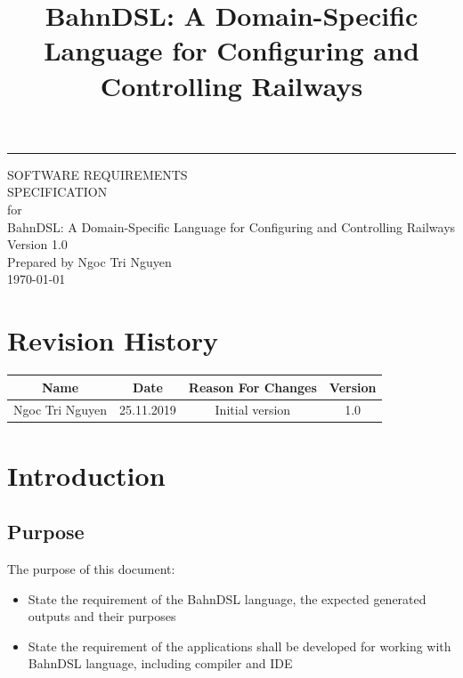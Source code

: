 \documentclass[a4paper,11pt]{scrreprt}
\date{}
\title{BahnDSL: A Domain-Specific Language for Configuring and Controlling Railways}
\def\myversion{1.0 }
\begin{document}
\begin{flushright}
    \rule{16cm}{5pt}\vskip1cm
    \begin{bfseries}
        \Huge{SOFTWARE REQUIREMENTS\\ SPECIFICATION}\\
        \vspace{1.9cm}
        for\\
        \vspace{1.9cm}
        BahnDSL: A Domain-Specific Language for Configuring and Controlling Railways\\
        \vspace{1.9cm}
        \LARGE{Version \myversion}\\
        \vspace{1.9cm}
        Prepared by Ngoc Tri Nguyen\\
        \vspace{1.9cm}
        \today\\
    \end{bfseries}
\end{flushright}

\tableofcontents


\chapter*{Revision History}

\begin{center}
    \begin{tabular}{|c|c|c|c|}
        \hline
	    Name & Date & Reason For Changes & Version\\
        \hline
	    Ngoc Tri Nguyen & 25.11.2019 & Initial version & 1.0 \\
        \hline
    \end{tabular}
\end{center}

\chapter{Introduction}

\section{Purpose}
The purpose of this document:
\begin{itemize}
    \item State the requirement of the BahnDSL language, the expected generated outputs and their purposes
    \item State the requirement of the applications shall be developed for working with BahnDSL language, including compiler and IDE
\end{itemize}
\end{document}
